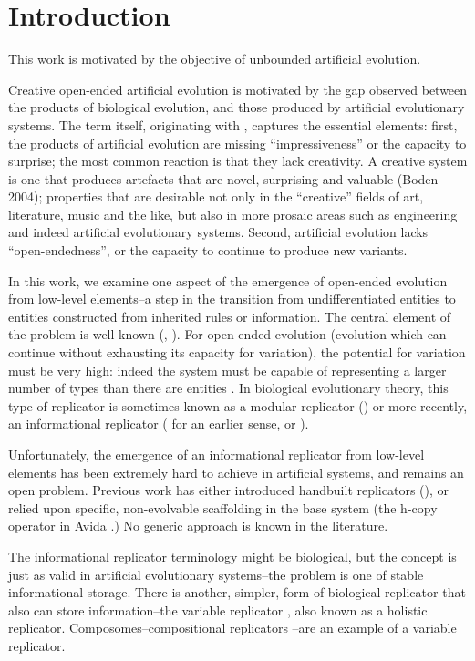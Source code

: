 \chapter{Introduction}\label{introduction}

This work is motivated by the objective of unbounded artificial evolution.

Creative open-ended artificial evolution is motivated by the gap observed between the products of biological evolution, and those produced by artificial evolutionary systems. The term itself, originating with \textcite{Taylor2001}, captures the essential elements: first, the products of artificial evolution are missing “impressiveness” or the capacity to surprise; the most common reaction is that they lack creativity. A creative system is one that produces artefacts that are novel, surprising and valuable (Boden 2004); properties that are desirable not only in the “creative” fields of art, literature, music and the like, but also in more prosaic areas such as engineering and indeed artificial evolutionary systems. Second, artificial evolution lacks “open-endedness”, or the capacity to continue to produce new variants. 

In this work, we examine one aspect of the emergence of open-ended evolution from low-level elements--a step in the transition from undifferentiated entities to entities constructed from inherited rules or information. The central element of the problem is well known (\eg, \textcite{Maynard-Smith:1995lw, Szathmary2000}). For open-ended evolution (evolution which can continue without exhausting its capacity for variation), the potential for variation must be very high: indeed the system must be capable of representing a larger number of types than there are entities \parencite{Szathmary1999}. In biological evolutionary theory, this type of replicator is sometimes known as a modular replicator (\eg \cite{Szathmary2000}) or more recently, an informational replicator (\textcite{Orgel1992} for an earlier sense, or \cite{Zachar2010}). 

Unfortunately, the emergence of an informational replicator from low-level elements has been extremely hard to achieve in artificial systems, and remains an open problem. Previous work has either introduced handbuilt replicators (\eg \cite{Hutton2003}), or relied upon specific, non-evolvable scaffolding in the base system (\eg the h-copy operator in Avida \parencite{Ofria2004}.) No generic approach is known in the literature.

The informational replicator terminology might be biological, but the concept is just as valid in artificial evolutionary systems--the problem is one of stable informational storage. There is another, simpler, form of biological replicator that also can store information--the variable replicator \parencite{Zachar2010}, also known as a holistic replicator. Composomes--compositional replicators \parencite{Segre1998}--are an example of a variable replicator. 

